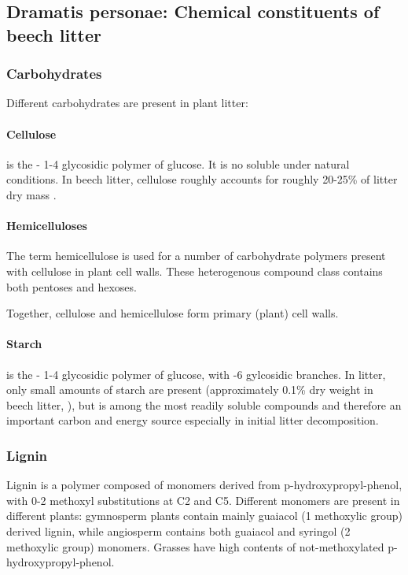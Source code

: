 \subsection{Dramatis personae: Chemical constituents of beech litter}

\subsubsection{Carbohydrates}
Different carbohydrates are present in plant litter: 

\paragraph{Cellulose} 
is the \textbeta - 1-4 glycosidic polymer of glucose. It is no soluble under natural conditions. In beech litter, cellulose roughly accounts for roughly 20-25\% of litter dry mass \citep{Leitner2011}.

\paragraph{Hemicelluloses}
The term hemicellulose is used for a number of carbohydrate polymers present with cellulose in plant cell walls. These heterogenous compound class contains both pentoses and hexoses. 

Together, cellulose and hemicellulose form primary (plant) cell walls. 

\paragraph{Starch} 
is the \textalpha - 1-4 glycosidic polymer of glucose, with -6 gylcosidic branches. In litter, only small amounts of starch are present (approximately 0.1\% dry weight in beech litter, \cite{Leitner2011}), but is among the most readily soluble compounds and therefore an important carbon and energy source especially in initial litter decomposition. 

\subsubsection{Lignin}

Lignin is a polymer composed of monomers derived from p-hydroxypropyl-phenol, with 0-2 methoxyl substitutions at C2 and C5. Different monomers are present in different plants: gymnosperm plants contain mainly guaiacol (1 methoxylic group) derived lignin, while angiosperm contains both guaiacol and syringol (2 methoxylic group) monomers. Grasses have high contents of not-methoxylated p-hydroxypropyl-phenol.

